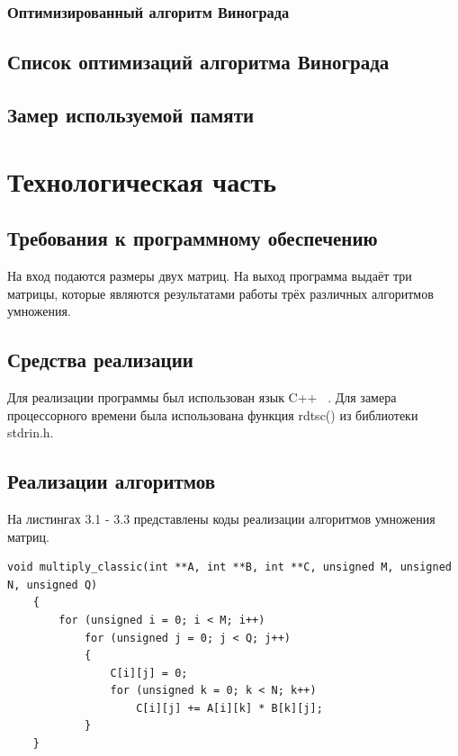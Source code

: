 \documentclass[12pt, a4paper]{report}
\begin{document}
	\subsection{Оптимизированный алгоритм Винограда}
	
	\section{Список оптимизаций алгоритма Винограда}
	
	\section{Замер используемой памяти}
	

	\newpage
	
	\chapter{Технологическая часть}
	\section{Требования к программному обеспечению}
	На вход подаются размеры двух матриц. На выход программа выдаёт три матрицы, которые являются результатами работы трёх различных алгоритмов умножения.
	\section{Средства реализации}
	Для реализации программы был использован язык C++ ~\cite{CPP}. Для замера процессорного времени была использована функция rdtsc() из библиотеки stdrin.h.
	\section{Реализации алгоритмов}
	На листингах 3.1 - 3.3 представлены коды реализации алгоритмов умножения матриц.
	\begin{lstlisting}[label=some-code,caption=Классический алгоритм]
	void multiply_classic(int **A, int **B, int **C, unsigned M, unsigned N, unsigned Q)
	{
		for (unsigned i = 0; i < M; i++)
			for (unsigned j = 0; j < Q; j++)
			{
				C[i][j] = 0;
				for (unsigned k = 0; k < N; k++)
					C[i][j] += A[i][k] * B[k][j];
			}
	}
	\end{lstlisting}
\end{document}
